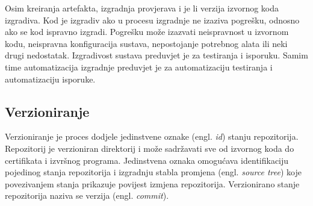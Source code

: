 \documentclass[times, utf8, diplomski, numeric]{fer}
\newcommand{\eng}[1]{(engl. \textit{#1})}
\begin{document}
Osim kreiranja artefakta, izgradnja provjerava i je li verzija izvornog koda izgradiva. Kod je izgradiv ako u procesu izgradnje ne izaziva pogrešku, odnosno ako se kod ispravno izgradi. Pogrešku može izazvati neispravnost u izvornom kodu, neispravna konfiguracija sustava, nepostojanje potrebnog alata ili neki drugi nedostatak. Izgradivost sustava preduvjet je za testiranja i isporuku. Samim time automatizacija izgradnje preduvjet je za automatizaciju testiranja i automatizaciju isporuke.

\subsection{Verzioniranje} \label{header:Verzioniranje}

Verzioniranje je proces dodjele jedinstvene oznake \eng{id} stanju repozitorija. Repozitorij je verzioniran direktorij i može sadržavati sve od izvornog koda do certifikata i izvršnog programa. Jedinstvena oznaka omogućava identifikaciju pojedinog stanja repozitorija i izgradnju stabla promjena \eng{source tree} koje povezivanjem stanja prikazuje povijest izmjena repozitorija. Verzionirano stanje repozitorija naziva se verzija \eng{commit}\citep{wiki:SoftwareVersioning}.
\end{document}
